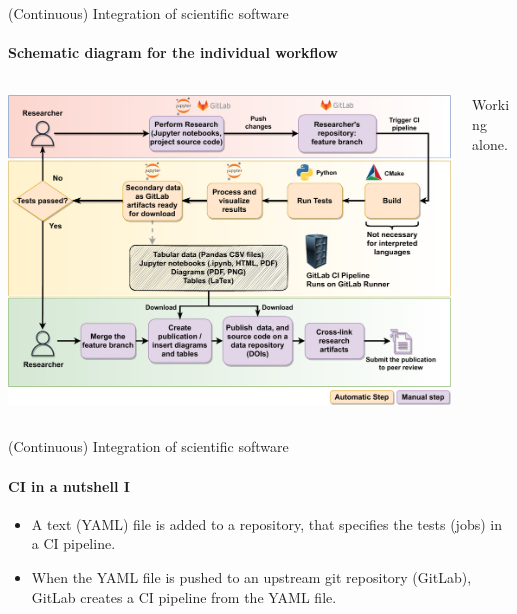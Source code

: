 \begin{frame}{(Continuous) Integration of scientific software} 
	\framesubtitle{Schematic diagram for the individual workflow}
        \vfill

        \centering

        \begin{columns}
            \begin{column}[c]{0.55\textwidth}
                \includegraphics[width=\columnwidth]{figures/ZINF-CI-diagram-individual.pdf}
            \end{column}
            \begin{column}[c]{0.20\textwidth}
                Working alone. 
            \end{column}
        \end{columns}
\end{frame}

\begin{frame}{(Continuous) Integration of scientific software} 
\framesubtitle{CI in a nutshell I}

    \vfill

    \begin{itemize}
        \item A text (YAML) file is added to a repository, that specifies the tests (jobs) in a CI pipeline. 

        \item When the YAML file is pushed to an upstream git repository (GitLab), GitLab creates a CI pipeline from the YAML file. 
    \end{itemize}
\end{frame}


